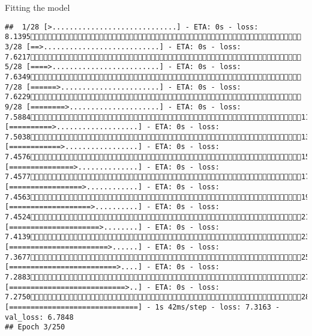 \documentclass[
  ignorenonframetext,
]{beamer}
\begin{document}
\begin{frame}[fragile]{Fitting the model}
\begin{verbatim}
##  1/28 [>.............................] - ETA: 0s - loss: 8.1395 3/28 [==>...........................] - ETA: 0s - loss: 7.6217 5/28 [====>.........................] - ETA: 0s - loss: 7.6349 7/28 [======>.......................] - ETA: 0s - loss: 7.6229 9/28 [========>.....................] - ETA: 0s - loss: 7.588411/28 [==========>...................] - ETA: 0s - loss: 7.503813/28 [============>.................] - ETA: 0s - loss: 7.457615/28 [===============>..............] - ETA: 0s - loss: 7.457717/28 [=================>............] - ETA: 0s - loss: 7.456319/28 [===================>..........] - ETA: 0s - loss: 7.452421/28 [=====================>........] - ETA: 0s - loss: 7.413923/28 [=======================>......] - ETA: 0s - loss: 7.367725/28 [=========================>....] - ETA: 0s - loss: 7.288327/28 [===========================>..] - ETA: 0s - loss: 7.275028/28 [==============================] - 1s 42ms/step - loss: 7.3163 - val_loss: 6.7848
## Epoch 3/250

\end{verbatim}
\end{frame}
\end{document}
